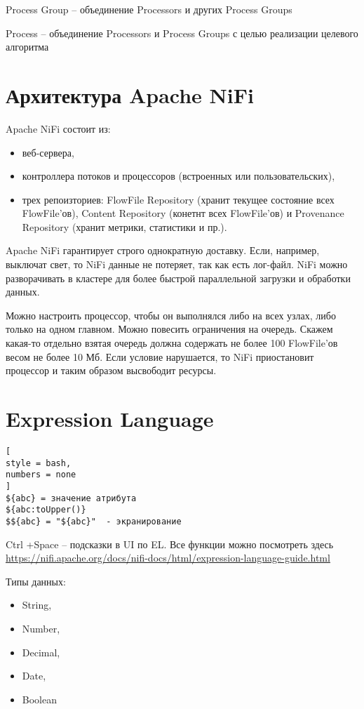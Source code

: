 \documentclass[%
	11pt,
	a4paper,
	utf8,
		]{article}
\begin{document}
Process Group -- объединение Processors и других Process Groups

Process -- объединение Processors и Process Groups с целью реализации целевого алгоритма

\section{Архитектура Apache NiFi}

Apache NiFi состоит из:
\begin{itemize}
	\item веб-сервера,
	
	\item контроллера потоков и процессоров (встроенных или пользовательских),
	
	\item трех репоизториев: FlowFile Repository (хранит текущее состояние всех FlowFile'ов), Content Repository (конетнт всех FlowFile'ов) и Provenance Repository (хранит метрики, статистики и пр.).
\end{itemize}

Apache NiFi гарантирует строго однократную доставку. Если, например, выключат свет, то NiFi данные не потеряет, так как есть лог-файл. NiFi можно разворачивать в кластере для более быстрой параллельной загрузки и обработки данных.

Можно настроить процессор, чтобы он выполнялся либо на всех узлах, либо только на одном главном. Можно повесить ограничения на очередь. Скажем какая-то отдельно взятая очередь должна содержать не более 100 FlowFile'ов весом не более 10 Мб. Если условие нарушается, то NiFi приостановит процессор и таким образом высвободит ресурсы.

\section{Expression Language}

\begin{lstlisting}[
style = bash,
numbers = none
]
${abc} = значение атрибута
${abc:toUpper()}
$${abc} = "${abc}"  - экранирование
\end{lstlisting}

Ctrl +Space -- подсказки в UI по EL. Все функции можно посмотреть здесь \url{https://nifi.apache.org/docs/nifi-docs/html/expression-language-guide.html}

Типы данных:
\begin{itemize}
	\item String,
	
	\item Number, 
	
	\item Decimal,
	
	\item Date,
	
	\item Boolean
\end{itemize}
\end{document}
